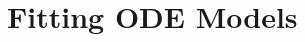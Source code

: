 \documentclass[aspectratio=169]{beamer}
\begin{document}
\section{Fitting ODE Models}\label{fitting-ode}


  

\end{document}
